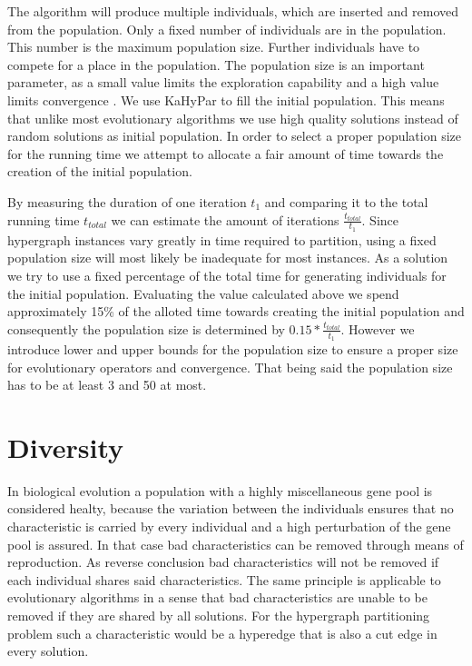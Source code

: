 \documentclass[a4paper,12pt,titlepage, BCOR7mm,headsepline]{scrbook}
\numberwithin{equation}{section}
\begin{document}
The algorithm will produce multiple individuals, which are inserted and removed from the population. Only a fixed number of
individuals are in the population. This number is the maximum population size. Further individuals have to compete for a place in the population. 
The population size is an important parameter, as a small value limits the exploration capability and a high value limits convergence \cite{chen2012large}.
We use KaHyPar to fill the initial population. This means that unlike most evolutionary algorithms we use high quality solutions instead of random solutions as initial population.
In order to select a proper population size for the running time we attempt to allocate a fair amount of time towards the creation of the initial population. 

By measuring the duration of one iteration $t_1$ and comparing it to the total running time ${t_{total}}$ we can estimate the amount of iterations $\frac{t_{total}}{t_1}$. Since hypergraph instances
vary greatly in time required to partition, using a fixed population size will most likely be inadequate for most instances. As a solution we try to use a fixed percentage of the total time for generating 
individuals for the initial population. Evaluating the value calculated above we spend approximately 15\% of the alloted time towards creating the initial population and consequently the population size is determined by $0.15*\frac{t_{total}}{t_1}$.
However we introduce lower and upper bounds for the population size to ensure a proper size for evolutionary operators and convergence. That being said the population size has to be at least 3 and 50 at most.
\section{Diversity}
\label{sec:diversity}
In biological evolution a population with a highly miscellaneous gene pool is considered healty, because the variation between the individuals ensures that no characteristic is carried by every individual and a high perturbation of the gene pool is assured. In that case bad characteristics can be removed through means of reproduction. As reverse conclusion bad characteristics will not be removed if each individual shares said characteristics. 
The same principle is applicable to evolutionary algorithms in a sense that bad characteristics are unable to be removed if they are shared by all solutions. For the hypergraph partitioning problem such a characteristic would be a hyperedge that is also a cut edge in every solution. 
\end{document}

